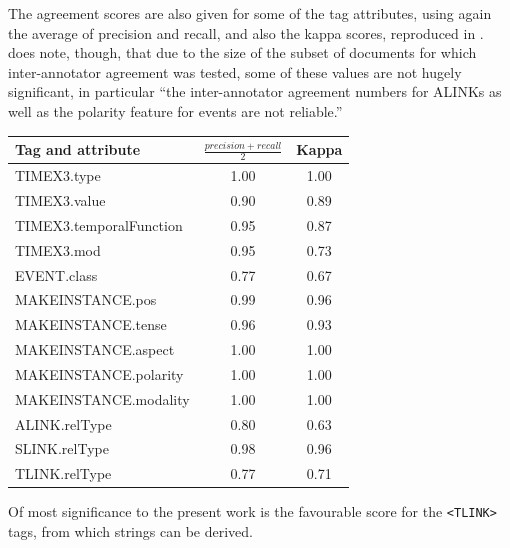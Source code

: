 \documentclass[a4paper,12pt,leqno,twoside]{article}
\begin{document}
The agreement scores are also given for some of the tag attributes, using again the average of precision and recall, and also the kappa scores, reproduced in . \citet{timeml2005timeml} does note, though, that due to the size of the subset of documents for which inter-annotator agreement was tested, some of these values are not hugely significant, in particular ``the inter-annotator
agreement numbers for ALINKs as well as the polarity feature for events are not reliable.''
\begin{center}
	\begin{tabular}[]{|l c c|}
		\hline
		\textbf{Tag and attribute} & \textbf{$\frac{precision+recall}{2}$} & \textbf{Kappa}\\
		\hline
		TIMEX3.type & 1.00 & 1.00\\
		TIMEX3.value & 0.90 & 0.89\\
		TIMEX3.temporalFunction & 0.95 & 0.87\\
		TIMEX3.mod & 0.95 & 0.73\\
		EVENT.class & 0.77 & 0.67\\
		MAKEINSTANCE.pos & 0.99 & 0.96\\
		MAKEINSTANCE.tense & 0.96 & 0.93\\
		MAKEINSTANCE.aspect & 1.00 & 1.00\\
		MAKEINSTANCE.polarity & 1.00 & 1.00\\
		MAKEINSTANCE.modality & 1.00 & 1.00\\
		ALINK.relType & 0.80 & 0.63\\
		SLINK.relType & 0.98 & 0.96\\
		TLINK.relType & 0.77 & 0.71\\
		\hline
	\end{tabular}
	\label{fig:inter-annotator-timebank-attrs}
\end{center}
Of most significance to the present work is the favourable score for the \verb|<TLINK>| tags, from which strings can be derived.
\end{document}
